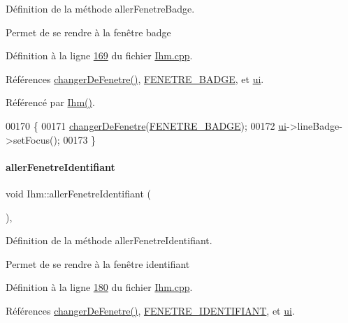 Définition de la méthode aller\+Fenetre\+Badge. 

Permet de se rendre à la fenêtre badge 

Définition à la ligne \hyperlink{_ihm_8cpp_source_l00169}{169} du fichier \hyperlink{_ihm_8cpp_source}{Ihm.\+cpp}.



Références \hyperlink{_ihm_8cpp_source_l00077}{changer\+De\+Fenetre()}, \hyperlink{_ihm_8h_source_l00026}{F\+E\+N\+E\+T\+R\+E\+\_\+\+B\+A\+D\+GE}, et \hyperlink{_ihm_8h_source_l00099}{ui}.



Référencé par \hyperlink{_ihm_8cpp_source_l00029}{Ihm()}.


\begin{DoxyCode}
00170 \{
00171     \hyperlink{class_ihm_ab33d5d0a85d60a8d41bae11c34435d50}{changerDeFenetre}(\hyperlink{_ihm_8h_a280ed5a4ea1cf0cd4c224443fa33db12a1f316de8685375f757a120ce0fde7af2}{FENETRE\_BADGE});
00172     \hyperlink{class_ihm_a0ac5f47856566ceeeca1720109bf70ea}{ui}->lineBadge->setFocus();
00173 \}
\end{DoxyCode}
\mbox{\label{class_ihm_ac464b57ceab0451e8bbc56e40c1bb3a9}} 
\paragraph{\texorpdfstring{aller\+Fenetre\+Identifiant}{allerFenetreIdentifiant}}
{\footnotesize\ttfamily void Ihm\+::aller\+Fenetre\+Identifiant (\begin{DoxyParamCaption}{ }\end{DoxyParamCaption})\hspace{0.3cm}{\ttfamily [private]}, {\ttfamily [slot]}}



Définition de la méthode aller\+Fenetre\+Identifiant. 

Permet de se rendre à la fenêtre identifiant 

Définition à la ligne \hyperlink{_ihm_8cpp_source_l00180}{180} du fichier \hyperlink{_ihm_8cpp_source}{Ihm.\+cpp}.



Références \hyperlink{_ihm_8cpp_source_l00077}{changer\+De\+Fenetre()}, \hyperlink{_ihm_8h_source_l00027}{F\+E\+N\+E\+T\+R\+E\+\_\+\+I\+D\+E\+N\+T\+I\+F\+I\+A\+NT}, et \hyperlink{_ihm_8h_source_l00099}{ui}.



